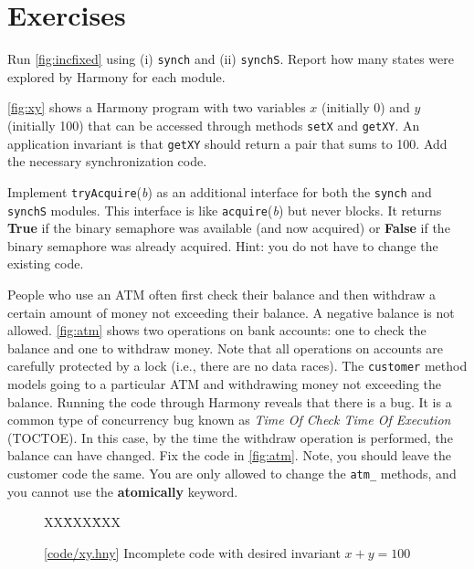 \documentclass{report}
\newcommand{\harmonysource}[1]{
\begin{tabbing}
XX\=XXX\=XXX\kill
    
\end{tabbing}
}
\newcommand{\harmonylink}[1]{%
[\href{https://harmony.cs.cornell.edu/#1}{\underline{#1}}]%
}
\newenvironment{code}{
\tcolorbox
}{
\endtcolorbox
}
\begin{document}
\section*{Exercises}
\begin{problems}
\item
Run \autoref{fig:incfixed} using (i) \texttt{synch} and (ii) \texttt{synchS}.
Report how many states were explored by Harmony for each module.
\item \label{ex:xy} \autoref{fig:xy} shows a Harmony program with two variables $x$
(initially 0) and $y$ (initially 100) that can be accessed through methods
\texttt{setX} and \texttt{getXY}.  An application invariant is that \texttt{getXY}
should return a pair that sums to 100.  Add the necessary synchronization code.
\item \label{ex:trylock} Implement \texttt{tryAcquire}(\textit{b}) as an additional
interface for both the \texttt{synch} and \texttt{synchS} modules.
This interface is like \texttt{acquire}(\textit{b}) but never blocks.  It
returns \textbf{True} if the binary semaphore was available (and now acquired) or \textbf{False}
if the binary semaphore was already acquired.
Hint: you do not have to change the existing code.
\item People who use an ATM often first check their balance and then withdraw
a certain amount of money not exceeding their balance.  A negative balance
is not allowed.  \autoref{fig:atm} shows two operations on bank accounts:
one to check the balance and one to withdraw money.
Note that all operations on accounts are carefully protected by a lock
(i.e., there are no data races).
The \texttt{customer}
method models going to a particular ATM and withdrawing money not exceeding
the balance.
Running the code through Harmony reveals that there is a bug.
It is a common type of concurrency bug known as \emph{Time Of Check Time Of
Execution} (TOCTOE).
In this case, by the time the withdraw operation is performed,
the balance can have changed.
Fix the code in \autoref{fig:atm}.  Note, you should leave the
customer code the same. You are only allowed to change the
\texttt{atm\_} methods, and you cannot use the \textbf{atomically}
keyword.
\end{problems}

\begin{figure}
\begin{code}
\harmonysource{xy}
\end{code}
\caption{\harmonylink{code/xy.hny} Incomplete code with desired invariant $x + y = 100$}
\label{fig:xy}
\end{figure}
\end{document}
